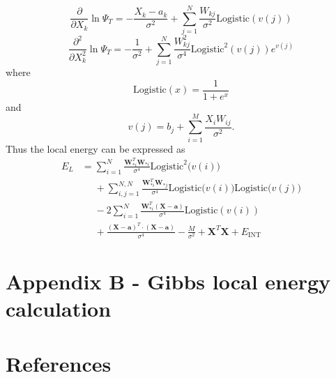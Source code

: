 \documentclass[norsk,a4paper,12pt]{article}
\begin{document}
\begin{equation}
\frac{\partial}{\partial X_k}\ln\Psi_T=-\frac{X_k-a_k}{\sigma^2}+\sum_{j=1}^{N}\frac{W_{kj}}{\sigma^2}\text{Logistic}(v(j))
\end{equation}
\begin{equation}
\frac{\partial^2}{\partial X_k^2}\ln\Psi_T=-\frac{1}{\sigma^2}+\sum_{j=1}^{N}\frac{W_{kj}^2}{\sigma^4}\text{Logistic}^2(v(j))e^{v(j)}
\end{equation}
where 
\begin{equation}
\text{Logistic}(x)=\frac{1}{1+e^x}
\end{equation}
and
\begin{equation}
v(j)=b_j+\sum_{i=1}^{M}\frac{X_iW_{ij}}{\sigma^2}.
\end{equation}
Thus the local energy can be expressed as
\begin{align}
E_L&=\sum_{i=1}^{N}\frac{\boldsymbol{W}_{*i}^T\boldsymbol{W}_{*i}}{\sigma^4}\text{Logistic}^2\big(v(i)\big)\\
&\phantom{=}+\sum_{i,j=1}^{N,N}\frac{\boldsymbol{W}_{*i}^T\boldsymbol{W}_{*j}}{\sigma^4}\text{Logistic}\big(v(i)\big)\text{Logistic}\big(v(j)\big)\\
&\phantom{=}-2\sum_{i=1}^N\frac{\boldsymbol{W}_{*i}^T(\boldsymbol{X}-\boldsymbol{a})}{\sigma^4}\text{Logistic}(v(i))\\
&\phantom{=}+\frac{(\boldsymbol{X}-\boldsymbol{a})^T\cdot(\boldsymbol{X}-\boldsymbol{a})}{\sigma^4}-\frac{M}{\sigma^2}+\boldsymbol{X}^T\boldsymbol{X}+E_{\text{INT}}
\end{align}

\section{Appendix B - Gibbs local energy calculation} \label{sec:appendix_B}


\newpage
\section{References}
\end{document}

